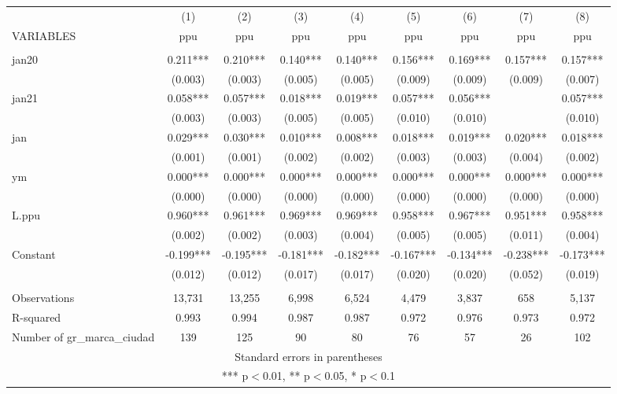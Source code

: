 \begin{tabular}{lcccccccc} \hline
 & (1) & (2) & (3) & (4) & (5) & (6) & (7) & (8) \\
VARIABLES & ppu & ppu & ppu & ppu & ppu & ppu & ppu & ppu \\ \hline
 &  &  &  &  &  &  &  &  \\
jan20 & 0.211*** & 0.210*** & 0.140*** & 0.140*** & 0.156*** & 0.169*** & 0.157*** & 0.157*** \\
 & (0.003) & (0.003) & (0.005) & (0.005) & (0.009) & (0.009) & (0.009) & (0.007) \\
jan21 & 0.058*** & 0.057*** & 0.018*** & 0.019*** & 0.057*** & 0.056*** &  & 0.057*** \\
 & (0.003) & (0.003) & (0.005) & (0.005) & (0.010) & (0.010) &  & (0.010) \\
jan & 0.029*** & 0.030*** & 0.010*** & 0.008*** & 0.018*** & 0.019*** & 0.020*** & 0.018*** \\
 & (0.001) & (0.001) & (0.002) & (0.002) & (0.003) & (0.003) & (0.004) & (0.002) \\
ym & 0.000*** & 0.000*** & 0.000*** & 0.000*** & 0.000*** & 0.000*** & 0.000*** & 0.000*** \\
 & (0.000) & (0.000) & (0.000) & (0.000) & (0.000) & (0.000) & (0.000) & (0.000) \\
L.ppu & 0.960*** & 0.961*** & 0.969*** & 0.969*** & 0.958*** & 0.967*** & 0.951*** & 0.958*** \\
 & (0.002) & (0.002) & (0.003) & (0.004) & (0.005) & (0.005) & (0.011) & (0.004) \\
Constant & -0.199*** & -0.195*** & -0.181*** & -0.182*** & -0.167*** & -0.134*** & -0.238*** & -0.173*** \\
 & (0.012) & (0.012) & (0.017) & (0.017) & (0.020) & (0.020) & (0.052) & (0.019) \\
 &  &  &  &  &  &  &  &  \\
Observations & 13,731 & 13,255 & 6,998 & 6,524 & 4,479 & 3,837 & 658 & 5,137 \\
R-squared & 0.993 & 0.994 & 0.987 & 0.987 & 0.972 & 0.976 & 0.973 & 0.972 \\
 Number of gr\_marca\_ciudad & 139 & 125 & 90 & 80 & 76 & 57 & 26 & 102 \\ \hline
\multicolumn{9}{c}{ Standard errors in parentheses} \\
\multicolumn{9}{c}{ *** p$<$0.01, ** p$<$0.05, * p$<$0.1} \\
\end{tabular}
